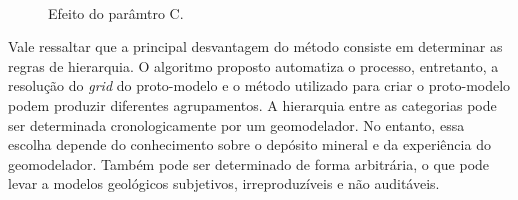 \begin{figure}[H]
    \caption{Efeito do parâmtro C.} \label{fig:sensitivity_c}
     \centering
     \hspace{1em}
      \\
\end{figure}

Vale ressaltar que a principal desvantagem do método consiste em determinar as regras de hierarquia. O algoritmo proposto automatiza o processo, entretanto, a resolução do \textit{grid} do proto-modelo e o método utilizado para criar o proto-modelo podem produzir diferentes agrupamentos. A hierarquia entre as categorias pode ser determinada cronologicamente por um geomodelador. No entanto, essa escolha depende do conhecimento sobre o depósito mineral e da experiência do geomodelador. Também pode ser determinado de forma arbitrária, o que pode levar a modelos geológicos subjetivos, irreproduzíveis e não auditáveis.